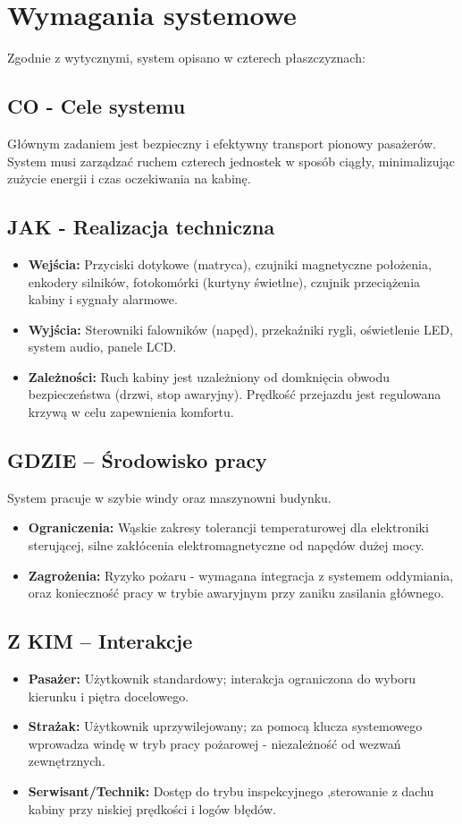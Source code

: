 \documentclass[12pt,a4paper]{article}
\begin{document}
\section{Wymagania systemowe}
Zgodnie z wytycznymi, system opisano w czterech płaszczyznach:

\subsection{CO - Cele systemu}
Głównym zadaniem jest bezpieczny i efektywny transport pionowy pasażerów. System musi zarządzać ruchem czterech jednostek w sposób ciągły, minimalizując zużycie energii i czas oczekiwania na kabinę.

\subsection{JAK - Realizacja techniczna}
\begin{itemize}
    \item \textbf{Wejścia:} Przyciski dotykowe (matryca), czujniki magnetyczne położenia, enkodery silników, fotokomórki (kurtyny świetlne), czujnik przeciążenia kabiny i sygnały alarmowe.
    \item \textbf{Wyjścia:} Sterowniki falowników (napęd), przekaźniki rygli, oświetlenie LED, system audio, panele LCD.
    \item \textbf{Zależności:} Ruch kabiny jest uzależniony od domknięcia obwodu bezpieczeństwa (drzwi, stop awaryjny). Prędkość przejazdu jest regulowana krzywą  w celu zapewnienia komfortu.
\end{itemize}

\subsection{GDZIE -- Środowisko pracy}
System pracuje w szybie windy oraz maszynowni budynku.
\begin{itemize}[noitemsep]
    \item \textbf{Ograniczenia:} Wąskie zakresy tolerancji temperaturowej dla elektroniki sterującej, silne zakłócenia elektromagnetyczne od napędów dużej mocy.
    \item \textbf{Zagrożenia:} Ryzyko pożaru - wymagana integracja z systemem oddymiania, oraz konieczność pracy w trybie awaryjnym przy zaniku zasilania głównego.
\end{itemize}

\subsection{Z KIM -- Interakcje}
\begin{itemize}
    \item \textbf{Pasażer:} Użytkownik standardowy; interakcja ograniczona do wyboru kierunku i piętra docelowego.
    \item \textbf{Strażak:} Użytkownik uprzywilejowany; za pomocą klucza systemowego wprowadza windę w tryb pracy pożarowej - niezależność od wezwań zewnętrznych.
    \item \textbf{Serwisant/Technik:} Dostęp do trybu inspekcyjnego ,sterowanie z dachu kabiny przy niskiej prędkości i logów błędów.
\end{itemize}
\end{document}
